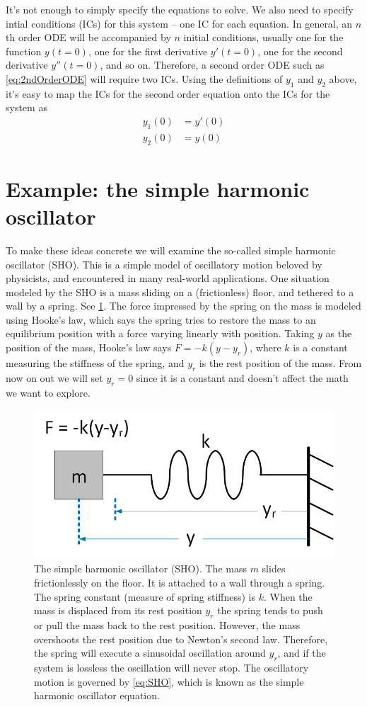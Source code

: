 \documentclass[hidelinks,notitlepage]{book}
\begin{document}
It's not enough to simply specify the equations to solve.  We also need to specify intial conditions (ICs) for this system -- one IC for each equation.  In general, an $n$th order ODE will be accompanied by $n$ initial conditions, usually one for the function $y(t=0)$, one for the first derivative $y'(t=0)$, one for the second derivative $y''(t=0)$, and so on.  Therefore, a second order ODE such as \cref{eq:2ndOrderODE} will require two ICs.  Using the definitions of $y_1$ and $y_2$ above, it's easy to map the ICs for the second order equation onto the ICs for the system as
\begin{align}
\nonumber
y_1(0) &= y'(0) \\
\nonumber
y_2(0) &= y(0)
\end{align}


\section{Example: the simple harmonic oscillator}
\label{sect:SHO}
To make these ideas concrete we will examine the so-called simple harmonic oscillator (SHO).  This is a simple model of oscillatory motion beloved by physicists, and encountered in many real-world applications.  One situation modeled by the SHO is a mass sliding on a (frictionless) floor, and tethered to a wall by a spring.  See \cref{fig:SlidingSHO}.  The force impressed by the spring on the mass is modeled using Hooke's law, which says the spring tries to restore the mass to an equilibrium position with a force varying linearly with position.  Taking $y$ as the position of the mass, Hooke's law says $F = -k (y-y_r)$, where $k$ is a constant measuring the stiffness of the spring, and $y_r$ is the rest position of the mass.  From now on out we will set $y_r = 0$ since it is a constant and doesn't affect the math we want to explore.
\begin{figure}[tbh]
	\centering
	\includegraphics[width=0.5\columnwidth]{SlidingSHO.png}
	\caption{The simple harmonic oscillator (SHO).  The mass $m$ slides frictionlessly on the floor.  It is attached to a wall through a spring.  The spring constant (measure of spring stiffness) is $k$.  When the mass is displaced from its rest position $y_r$ the spring tends to push or pull the mass back to the rest position.  However, the mass overshoots the rest position due to Newton's second law.  Therefore, the spring will execute a sinusoidal oscillation around $y_r$, and if the system is lossless the oscillation will never stop.  The oscillatory motion is governed by \cref{eq:SHO}, which is known as the simple harmonic oscillator equation.}
	\label{fig:SlidingSHO}
\end{figure}
\end{document}
